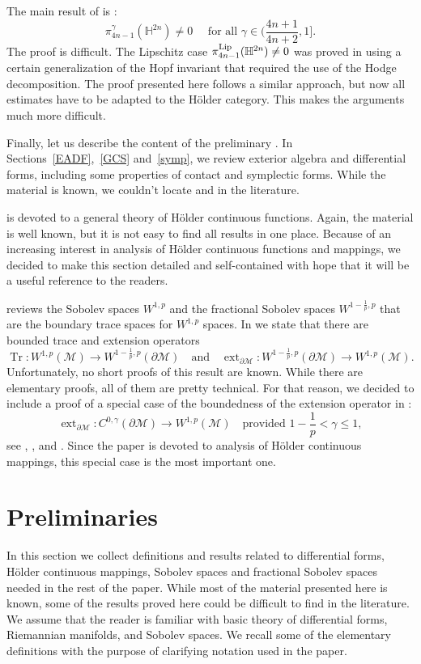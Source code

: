 \documentclass[intlimits,12pt,reqno]{amsart}
\newcommand{\cM}{\mathcal M}
\newcommand{\bbbh}{\mathbb H}
\numberwithin{equation}{section}
\def\ext{\operatorname{ext}}
\theoremstyle{definition}
\begin{document}
The main result of  is :
$$
\pi_{4n-1}^\gamma(\bbbh^{2n})\neq 0
\quad
\text{ for all } {\textstyle \gamma\in \big(\frac{4n+1}{4n+2},1\big].}
$$
The proof is difficult. The Lipschitz case $\pi_{4n-1}^{\rm Lip}(\bbbh^{2n})\neq 0$ was proved in \cite{HST14} using a certain generalization of the Hopf invariant that required the use of the Hodge decomposition. The proof presented here follows a similar approach, but now all estimates have to be adapted to the H\"older category. This makes the arguments much more difficult. 
 



Finally, let us describe the content of the preliminary .
In Sections~\ref{EADF},~\ref{GCS} and~\ref{symp}, we review exterior algebra and differential forms, including some properties of contact and symplectic forms.  While the material is known, we couldn't locate  and  in the literature.

 is devoted to a general theory of H\"older continuous functions. Again, the material is well known, but it is not easy to find all  results in one place. Because of an increasing interest in analysis of H\"older continuous functions and mappings, we decided to make this section detailed and self-contained with hope that it will be a useful reference to the readers.

 reviews the Sobolev spaces $W^{1,p}$ and the fractional Sobolev spaces $W^{1-\frac{1}{p},p}$ that are the boundary trace spaces for $W^{1,p}$ spaces. In  we state that there are bounded trace and extension operators
$$
\operatorname{Tr}:W^{1,p}(\cM)\to W^{1-\frac{1}{p},p}(\partial \cM)
\quad
\text{and}
\quad
\ext_{\partial\cM}:W^{1-\frac{1}{p},p}(\partial \cM)\to W^{1,p}(\cM).
$$
Unfortunately, no short proofs of this result are known. While there are elementary proofs, all of them are pretty technical. For that reason, we decided to include a proof of a special case of the boundedness of the extension operator in :
$$
\ext_{\partial\cM}:C^{0,\gamma}(\partial \cM)\to W^{1,p}(\cM)
\quad
\text{provided } \textstyle{1-\frac{1}{p}<\gamma\leq 1},
$$
see , ,  and . Since the paper is devoted to analysis of H\"older continuous mappings, this special case is the most important one.

\section{Preliminaries}
\label{pre}
In this section we collect definitions and results related to differential forms, H\"older continuous mappings,  Sobolev spaces and fractional Sobolev spaces needed in the rest of the paper. While most of the material presented here is known, some of the results proved here could be difficult to find in the literature. 
We assume that the reader is familiar with basic theory of differential forms, Riemannian manifolds, and Sobolev spaces. We recall some of the elementary definitions with the purpose of clarifying notation used in the paper.
\end{document}
